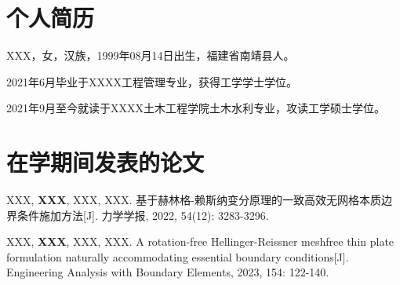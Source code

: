 \begin{cv}
    \section*{个人简历}
    XXX，女，汉族，1999年08月14日出生，福建省南靖县人。\par
    2021年6月毕业于XXXX工程管理专业，获得工学学士学位。\par
    2021年9月至今就读于XXXX土木工程学院土木水利专业，攻读工学硕士学位。
    \section*{在学期间发表的论文}
    \begin{enumerate}[{[1]}]
        \item XXX, \textbf{XXX}, XXX, XXX. 基于赫林格-赖斯纳变分原理的一致高效无网格本质边界条件施加方法[J]. 力学学报, 2022, 54(12): 3283-3296.
        \item XXX, \textbf{XXX}, XXX, XXX. A rotation-free Hellinger-Reissner meshfree thin plate formulation naturally accommodating essential boundary conditions[J]. Engineering Analysis with Boundary Elements, 2023, 154: 122-140.
    \end{enumerate}
\end{cv}
